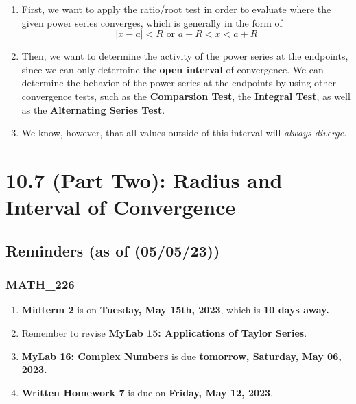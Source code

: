 \begin{enumerate}
  \item First, we want to apply the ratio/root test in order
        to evaluate where the given power series
        converges, which is generally in the form of
        \[ | x - a | < R \textrm{ or } a - R < x < a + R \]
  \item Then, we want to determine the activity of the
        power series at the endpoints, since we can only determine
        the \textbf{open interval} of convergence. We can
        determine the behavior of the power series at the
        endpoints by using other convergence tests, such
        as the \textbf{Comparsion Test}, the \textbf{Integral
        Test}, as well as the \textbf{Alternating Series Test}.
  \item We know, however, that all values outside of this
        interval will \textit{always diverge}.
\end{enumerate}


\chapter{10.7 (Part Two): Radius and Interval of Convergence}
\section{Reminders (as of (05/05/23))}
\subsection{MATH\_226}
\begin{enumerate}
  \item  \textbf{Midterm 2} is on \textbf{Tuesday, May 15th, 2023}, which is \textbf{10 days away.}
  \item Remember to revise \textbf{MyLab 15:
        Applications of Taylor Series}.
  \item \textbf{MyLab 16: Complex Numbers} is
        due \textbf{tomorrow, Saturday, May 06, 2023.}
  \item \textbf{Written Homework 7} is due on
        \textbf{Friday, May 12, 2023}.
\end{enumerate}
